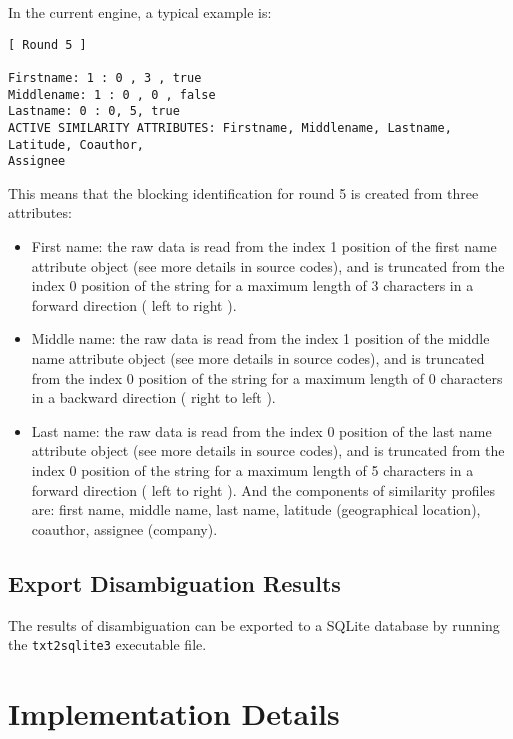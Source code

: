 \documentclass{article}
\begin{document}
In the current engine, a typical example is:

\begin{verbatim}
[ Round 5 ]

Firstname: 1 : 0 , 3 , true
Middlename: 1 : 0 , 0 , false
Lastname: 0 : 0, 5, true
ACTIVE SIMILARITY ATTRIBUTES: Firstname, Middlename, Lastname, Latitude, Coauthor,
Assignee
\end{verbatim}


This means that the blocking identification for round 5 is 
created from three attributes:

\begin{itemize}

\item First name: the raw data is read from the index 1 position 
of the first name attribute object (see more details in source codes), 
and is truncated from the index 0 position of the string for a
maximum length of 3 characters in a forward direction ( left to right ).

\item Middle name: the raw data is read from the index 1 position 
of the middle name attribute object (see more details in source codes), 
and is truncated from the index 0 position of the string for a
maximum length of 0 characters in a backward direction ( right to left ).

\item Last name: the raw data is read from the index 0 position of
the last name attribute object (see more details in source codes), 
and is truncated from the index 0 position of the string for a
maximum length of 5 characters in a forward direction ( left to right ).
And the components of similarity profiles are: first name, middle name,
last name, latitude (geographical location), coauthor, assignee (company).

\end{itemize}

\subsection{Export Disambiguation Results}

The results of disambiguation can be exported to a 
SQLite database by running the \texttt{txt2sqlite3}
executable file.



\section{Implementation Details}
\end{document}
